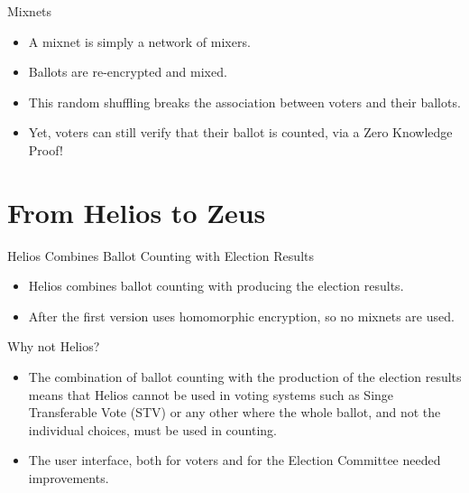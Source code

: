 \documentclass[utf8]{beamer}
\begin{document}
\begin{frame}{Mixnets}

  \begin{itemize}
  \item A mixnet is simply a network of mixers.
  \item Ballots are re-encrypted and mixed.
  \item This random shuffling breaks the association between voters
    and their ballots.
  \item Yet, voters can still verify that their ballot is counted, via
    a Zero Knowledge Proof!
  \end{itemize}
  
\end{frame}

\section{From Helios to Zeus}

\begin{frame}{Helios Combines Ballot Counting with Election Results}

  \begin{itemize}
  \item Helios combines ballot counting with producing the election
    results.
  \item After the first version uses homomorphic encryption, so no
    mixnets are used.
  \end{itemize}

\end{frame}

\begin{frame}{Why not Helios?}

  \begin{itemize}
  \item The combination of ballot counting with the production of the
    election results means that Helios cannot be used in voting
    systems such as Singe Transferable Vote (STV) or any other where
    the whole ballot, and not the individual choices, must be used in
    counting.
    \item The user interface, both for voters and for the Election
      Committee needed improvements.
  \end{itemize}
  
\end{frame}
\end{document}
